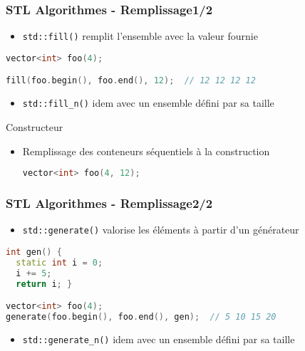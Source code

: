 \documentclass[C++.tex]{subfiles}
\begin{document}
\begin{frame}[fragile]
	\frametitle{STL Algorithmes - Remplissage\titlehfill{}1/2}
	\begin{itemize}
		\item \lstinline|std::fill()| remplit l'ensemble avec la valeur fournie
	\end{itemize}

	\begin{lstlisting}[language=C++]
vector<int> foo(4);

fill(foo.begin(), foo.end(), 12);  // 12 12 12 12\end{lstlisting}

	\begin{itemize}
		\item \lstinline|std::fill_n()| idem avec un ensemble défini par sa taille
	\end{itemize}

	\begin{block}{Constructeur}
		\begin{itemize}
			\item Remplissage des conteneurs séquentiels à la construction
			\begin{lstlisting}[language=C++]
vector<int> foo(4, 12);\end{lstlisting}
		\end{itemize}
	\end{block}
\end{frame}

\begin{frame}[fragile]
	\frametitle{STL Algorithmes - Remplissage\titlehfill{}2/2}
	\begin{itemize}
		\item \lstinline|std::generate()| valorise les éléments à partir d'un générateur
	\end{itemize}

	\begin{lstlisting}[language=C++]
int gen() {
  static int i = 0;
  i += 5;
  return i; }

vector<int> foo(4);
generate(foo.begin(), foo.end(), gen);  // 5 10 15 20\end{lstlisting}

	\begin{itemize}
		\item \lstinline|std::generate_n()| idem avec un ensemble défini par sa taille
	\end{itemize}
\end{frame}
\end{document}
